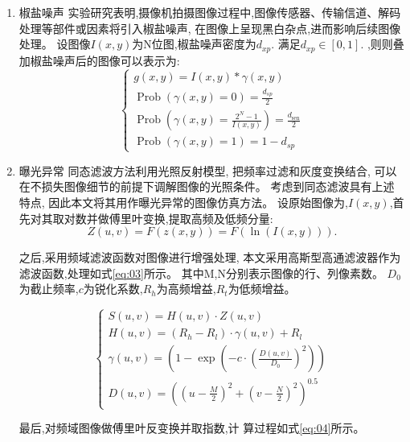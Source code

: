 \documentclass{amsart}
\begin{document}
\begin{enumerate}
\item 椒盐噪声
  实验研究表明,摄像机拍摄图像过程中,图像传感器、传输信道、解码处理等部件或因素将引入椒盐噪声,
  在图像上呈现黑白杂点,进而影响后续图像处理。
  设图像$I(x,y)$为N位图,椒盐噪声密度为$d_{xp}$.
  满足$d_{xp}\in [0,1]$.
  ,则则叠加椒盐噪声后的图像可以表示为:
  \begin{equation}
    \label{eq:01}
  \left\{\begin{array}{l}
g(x, y)=I(x, y) * \gamma(x, y) \\
\operatorname{Prob}(\gamma(x, y)=0)=\frac{d_{s p}}{2} \\
\operatorname{Prob}\left(\gamma(x, y)=\frac{2^{N}-1}{I(x, y)}\right)=\frac{d_{\operatorname{sen}}}{2} \\
\operatorname{Prob}(\gamma(x, y)=1)=1-d_{s p}
\end{array}\right.
  \end{equation}

\item 曝光异常
  同态滤波方法利用光照反射模型,
  把频率过滤和灰度变换结合,
  可以在不损失图像细节的前提下调解图像的光照条件。
  考虑到同态滤波具有上述特点,
  因此本文将其用作曝光异常的图像仿真方法。
  设原始图像为,$I(x,y)$,首先对其取对数并做傅里叶变换,提取高频及低频分量:
  \begin{equation}
    \label{eq:02}
Z(u, v)=F(z(x, y))=F(\ln (I(x, y))).
  \end{equation}

  之后,采用频域滤波函数对图像进行增强处理,
  本文采用高斯型高通滤波器作为滤波函数,处理如式\ref{eq:03}所示。
  其中M,N分别表示图像的行、列像素数。
  $D_0$为截止频率,$c$为锐化系数,$R_h$为高频增益,$R_t$为低频增益。

  \begin{equation}
    \label{eq:03}
\left\{\begin{array}{l}
S(u, v)=H(u, v) \cdot Z(u, v) \\
H(u, v)=\left(R_{h}-R_{l}\right) \cdot \gamma(u, v)+R_{l} \\
\gamma(u, v)=\left(1-\exp \left(-c \cdot\left(\frac{D(u, v)}{D_{0}}\right)^{2}\right)\right) \\
D(u, v)=\left(\left(u-\frac{M}{2}\right)^{2}+\left(v-\frac{N}{2}\right)^{2}\right)^{0.5}
\end{array}\right.
  \end{equation}

  最后,对频域图像做傅里叶反变换并取指数,计
  算过程如式\ref{eq:04}所示。


\end{enumerate}
\end{document}
